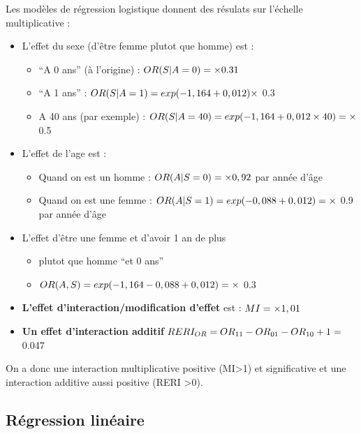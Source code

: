 \documentclass[
]{book}
\providecommand{\tightlist}{%
  \setlength{\itemsep}{0pt}\setlength{\parskip}{0pt}}
\begin{document}
Les modèles de régression logistique donnent des résulats sur l'échelle multiplicative :

\begin{itemize}
\tightlist
\item
  L'effet du sexe (d'être femme plutot que homme) est :

  \begin{itemize}
  \tightlist
  \item
    ``A 0 ans'' (à l'origine) : \(\small OR(S|A=0) = \times 0.31\)
  \item
    ``A 1 ans'' : \(\small OR(S|A=1) = exp(-1,164 + 0,012) \times\) 0.3
  \item
    A 40 ans (par exemple) : \(\small OR(S|A=40) = exp(-1,164 + 0,012 \times 40) = \times\) 0.5
  \end{itemize}
\item
  L'effet de l'age est :

  \begin{itemize}
  \tightlist
  \item
    Quand on est un homme : \(\small OR(A|S=0) = \times 0,92\) par année d'âge
  \item
    Quand on est une femme : \(\small OR(A|S=1) = exp(-0,088 + 0,012) = \times\) 0.9 par année d'âge
  \end{itemize}
\item
  L'effet d'être une femme et d'avoir 1 an de plus

  \begin{itemize}
  \tightlist
  \item
    plutot que homme ``et 0 ans''
  \item
    \(\small OR(A,S) = exp(-1,164 -0,088 + 0,012) = \times\) 0.3
  \end{itemize}
\item
  \textbf{L'effet d'interaction/modification d'effet} est : \(\small MI =\times 1,01\)
\item
  \textbf{Un effet d'interaction additif} \(\small RERI_{OR} = OR_{11} - OR_{01} - OR_{10} + 1 =\) 0.047
\end{itemize}

On a donc une interaction multiplicative positive (MI\textgreater1) et significative et une interaction additive aussi positive (RERI \textgreater0).

\hypertarget{ruxe9gression-linuxe9aire}{%
\subsection{Régression linéaire}\label{ruxe9gression-linuxe9aire}}
\end{document}
